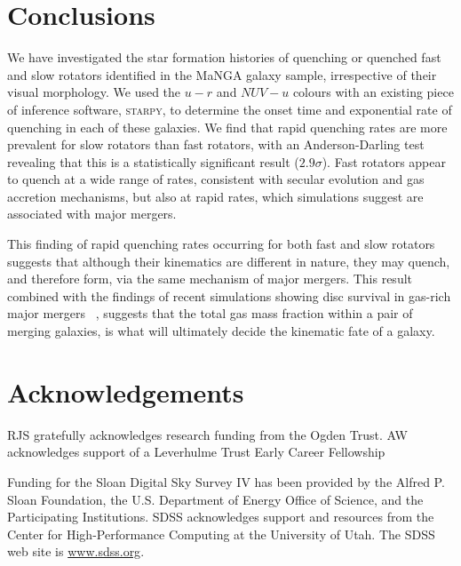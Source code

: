 \documentclass[useAMS,usenatbib]{mn2e}
\begin{document}
\section{Conclusions}

We have investigated the star formation histories of quenching or quenched fast and slow rotators identified in the MaNGA galaxy sample, irrespective of their visual morphology. We used the $u-r$ and $NUV-u$ colours with an existing piece of inference software, \textsc{starpy}, to determine the onset time and exponential rate of quenching in each of these galaxies. We find that rapid quenching rates are more prevalent for slow rotators than fast rotators, with an Anderson-Darling test revealing that this is a statistically significant result ($2.9\sigma$). Fast rotators appear to quench at a wide range of rates, consistent with secular evolution and gas accretion mechanisms, but also at rapid rates, which simulations suggest are associated with major mergers.   

This finding of rapid quenching rates occurring for both fast and slow rotators suggests that although their kinematics are different in nature, they may quench, and therefore form, via the same mechanism of major mergers. This result combined with the findings of recent simulations showing disc survival in gas-rich major mergers ~\citep{bois11, pontzen16, sparre16}, suggests that the total gas mass fraction within a pair of merging galaxies, is what will ultimately decide the kinematic fate of a galaxy. 

\section*{Acknowledgements}

RJS gratefully acknowledges research funding from the Ogden Trust. AW acknowledges support of a Leverhulme Trust Early Career Fellowship

Funding for the Sloan Digital Sky Survey IV has been provided by the
Alfred P. Sloan Foundation, the U.S. Department of Energy Office of
Science, and the Participating Institutions. SDSS acknowledges
support and resources from the Center for High-Performance Computing at the University of Utah. The SDSS web site is \url{www.sdss.org}.
\end{document}
